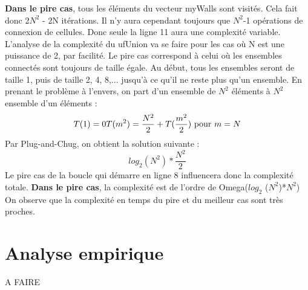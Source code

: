 \documentclass[11pt]{article}
\begin{document}
\begin{description}
\textbf{Dans le pire cas}, tous les éléments du vecteur myWalls sont visités. Cela fait donc 2$N^{2}$ - 2N  itérations. Il n'y aura cependant toujours que $N^{2}$-1 opérations de connexion de cellules. Donc seule la ligne 11 aura une complexité variable. L'analyse de la complexité du ufUnion va se faire pour les cas où N est une puissance de 2, par facilité. Le pire cas correspond à celui où les ensembles connectés sont toujours de taille égale. Au début, tous les ensembles seront de taille 1, puis de taille 2, 4, 8,... jusqu'à ce qu'il ne reste plus qu'un ensemble. En prenant le problème à l'envers, on part d'un ensemble de $N^{2}$ éléments à $N^{2}$ ensemble d'un éléments :
\begin{equation}
	T(1) = 0
	T(m^{2}) = \frac{N^{2}}{2} + T(\frac{m^{2}}{2}) $ pour $ m = N
\end{equation}
Par Plug-and-Chug, on obtient la solution suivante :
\begin{equation}
	log_{2} (N^{2}) * \frac{N^{2}}{2}
\end{equation}
Le pire cas de la boucle qui démarre en ligne 8 influencera donc la complexité totale.
\textbf{Dans le pire cas}, la complexité est de l'ordre de Omega($log_{2}$ ($N^{2}$)*$N^{2}$)
On observe que la complexité en temps du pire et du meilleur cas sont très proches.
\end{description}
\section{Analyse empirique}

A FAIRE
\end{document}
